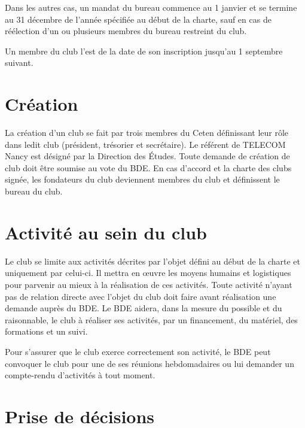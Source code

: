 \documentclass{article}
\begin{document}
\begin{multicols}{2}
{			Dans les autres cas, un mandat du bureau commence au 1
			janvier et se termine au 31 décembre de l'année spécifiée au début
			de la charte, sauf en cas de réélection d'un ou plusieurs membres du
			bureau restreint du club.

			Un membre du club l'est de la date de son inscription jusqu'au
			1 septembre suivant.

		}

		\section{Création}
\label{sec:creation}
		
		{\small
		
			La création d’un club se fait par trois membres du Ceten définissant
			leur rôle dans ledit club (président, trésorier et secrétaire). Le
			référent de TELECOM Nancy est désigné par la Direction des Études.
			Toute demande de création de club doit être soumise au vote du BDE\@.
			En cas d’accord et la charte des clubs signée, les fondateurs du
			club deviennent membres du club et définissent le bureau du club.
			
		}

		\section{Activité au sein du club}
\label{sec:activite}
		
		{\small
		
			Le club se limite aux activités décrites par l’objet défini au début
			de la charte et uniquement par celui-ci. Il mettra en œuvre les
			moyens humains et logistiques pour parvenir au mieux à la
			réalisation de ces activités. Toute activité n’ayant pas de relation
			directe avec l’objet du club doit faire avant réalisation une
			demande auprès du BDE\@. Le BDE aidera, dans la mesure du possible et
			du raisonnable, le club à réaliser ses activités, par un 
			financement, du matériel, des formations et un suivi.

			Pour s’assurer que le club exerce correctement son activité, le BDE
			peut convoquer le club pour une de ses réunions hebdomadaires ou lui
			demander un compte-rendu d’activités à tout moment.
			
		}

		\section{Prise de décisions}
\label{sec:decisions}
		

\end{multicols}
\end{document}
